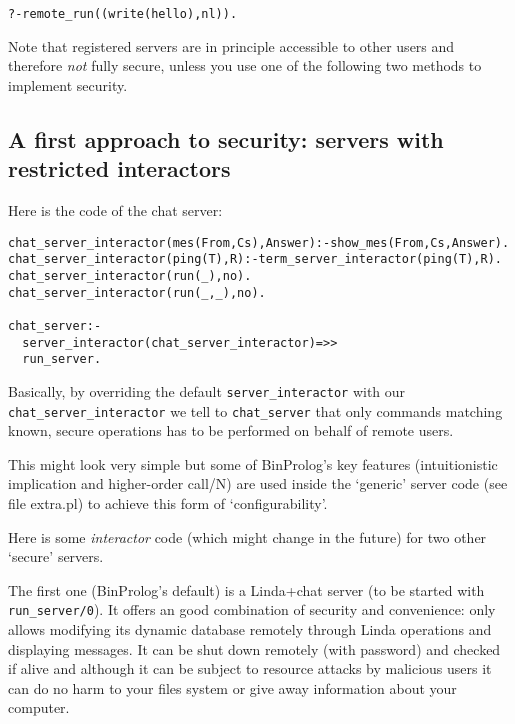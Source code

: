 \documentclass{article}
\begin{document}
\begin{verbatim}
?-remote_run((write(hello),nl)).
\end{verbatim}

Note that registered servers are in principle accessible
to other users and therefore {\em not} fully secure, unless
you use one of the following two methods to implement security.

\subsection{A first approach to security: servers with restricted interactors}

Here is the code of the chat server:

\begin{verbatim}
chat_server_interactor(mes(From,Cs),Answer):-show_mes(From,Cs,Answer).
chat_server_interactor(ping(T),R):-term_server_interactor(ping(T),R).
chat_server_interactor(run(_),no).
chat_server_interactor(run(_,_),no).

chat_server:-
  server_interactor(chat_server_interactor)=>>
  run_server.
\end{verbatim}

Basically, by overriding the default 
{\tt server\_interactor} with our {\tt chat\_server\_interactor}
we tell to {\tt chat\_server} that only commands matching
known, secure operations has to be performed on behalf
of remote users.

This might look very simple but some of BinProlog's key
features (intuitionistic implication and higher-order
call/N) are used inside the `generic' server code (see file extra.pl)
to achieve this form of `configurability'.

Here is some {\em interactor} code (which might change in the future) for
two other `secure' servers.


The first one (BinProlog's default) 
is a Linda+chat server (to be started with {\tt run\_server/0}).
It offers an good combination of security and convenience:
only allows modifying its dynamic database remotely through
Linda operations and displaying
messages. It can be shut down remotely (with password)
and checked if alive
and although it can be subject to resource attacks
by malicious users it can do no harm to your files
system or give away information about your computer.
\end{document}
